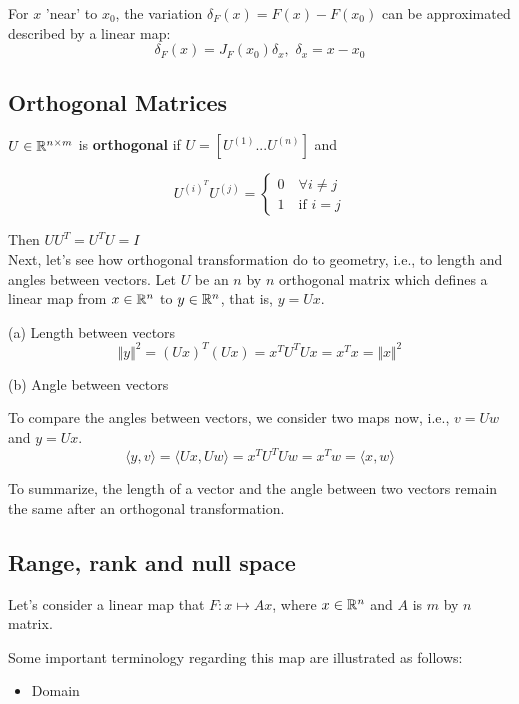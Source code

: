 For $x$ 'near' to $x_0$, the variation $\delta_F(x) =F(x) - F(x_0)$ can be approximated described by a linear map:
$$\delta_F(x) = J_F(x_0)\delta_x, \,\, \delta_x = x - x_0$$

\subsection{Orthogonal Matrices}

\begin{definition}
	$U\in \mathbb{R}^{n\times m}$ is \textbf{orthogonal} if $U = [U^{(1)} ... U^{(n)}]$
	and 
	
	$$ U^{(i)^T}U^{(j)}=\left\{
	\begin{aligned}
	0\quad \forall i\neq j\\
	1\quad \text{if } i = j
	\end{aligned}
	\right.
	$$
\end{definition}

Then $UU^T = U^TU = I$\\

Next, let's see how orthogonal transformation do to geometry, i.e., to length and angles between vectors. Let $U$ be an $n$ by $n$ orthogonal matrix which defines a linear map from $x\in\mathbb{R}^{n}$ to $y\in\mathbb{R}^{n}$, that is, $y= Ux$.

(a) Length between vectors
$$\Vert y\Vert^2 = (Ux)^T(Ux) = x^TU^TUx = x^Tx = \Vert x\Vert^2$$


(b) Angle between vectors

To compare the angles between vectors, we consider two maps now, i.e., $v= Uw$ and $y= Ux$.
$$\langle y, v\rangle = \langle Ux, Uw\rangle = x^TU^TUw = x^Tw = \langle x, w\rangle$$

To summarize, the length of a vector and the angle between two vectors remain the same after an orthogonal transformation.



\subsection{Range, rank and null space}

Let's consider a linear map that $F:x\mapsto Ax$, where $x\in\mathbb{R}^{n}$ and $A$ is $m$ by $n$ matrix.

Some important terminology regarding this map are illustrated as follows:

\begin{itemize}
	\item Domain
\end{itemize}


